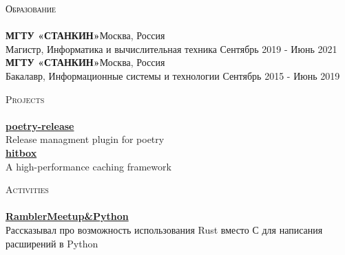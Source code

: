\documentclass[a4paper]{article}
\newcommand{\lineunder} {
    \vspace*{-8pt} \\
    \hspace*{-18pt} \hrulefill \\
}
\newcommand{\header} [1] {
    {\hspace*{-18pt}\vspace*{6pt} \textsc{#1}}
    \vspace*{-6pt} \lineunder
}
\begin{document}
\header{Образование}
\textbf{МГТУ «СТАНКИН»}\hfill Москва, Россия\\
Магистр, Информатика и вычислительная техника \hfill Сентябрь 2019 - Июнь 2021\\
\vspace{2mm}
\textbf{МГТУ «СТАНКИН»}\hfill Москва, Россия\\
Бакалавр, Информационные системы и технологии \hfill Сентябрь 2015 - Июнь 2019\\
\vspace{2mm}

\header{Projects}
{\textbf{\href{https://github.com/topenkoff/poetry-release}{poetry-release}}}\\
Release managment plugin for poetry\\

\vspace*{2mm}
{\textbf{\href{https://github.com/hit-box/hitbox}{hitbox}}}\\
A high-performance caching framework\\
\vspace*{2mm}

\header{Activities}
{\textbf{\href{https://www.youtube.com/watch?v=gpf_KOAmgzY&t=3040s}{RamblerMeetup\&Python}}}\\
Рассказывал про возможность использования Rust вместо С для написания расширений в Python
\vspace*{2mm}

\
\end{document}
